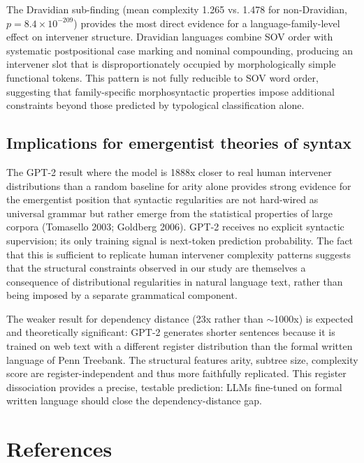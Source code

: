\documentclass[11pt,a4paper]{article}
\begin{document}
The Dravidian sub-finding (mean complexity 1.265 vs. 1.478 for non-Dravidian, $p = 8.4 \times 10^{-209}$) provides the most direct evidence for a language-family-level effect on intervener structure. Dravidian languages combine SOV order with systematic postpositional case marking and nominal compounding, producing an intervener slot that is disproportionately occupied by morphologically simple functional tokens. This pattern is not fully reducible to SOV word order, suggesting that family-specific morphosyntactic properties impose additional constraints beyond those predicted by typological classification alone.

\subsection{Implications for emergentist theories of syntax}

The GPT-2 result where the model is 1888x closer to real human intervener distributions than a random baseline for arity alone provides strong evidence for the emergentist position that syntactic regularities are not hard-wired as universal grammar but rather emerge from the statistical properties of large corpora (Tomasello 2003; Goldberg 2006). GPT-2 receives no explicit syntactic supervision; its only training signal is next-token prediction probability. The fact that this is sufficient to replicate human intervener complexity patterns suggests that the structural constraints observed in our study are themselves a consequence of distributional regularities in natural language text, rather than being imposed by a separate grammatical component.

The weaker result for dependency distance (23x rather than ${\sim}$1000x) is expected and theoretically significant: GPT-2 generates shorter sentences because it is trained on web text with a different register distribution than the formal written language of Penn Treebank. The structural features arity, subtree size, complexity score are register-independent and thus more faithfully replicated. This register dissociation provides a precise, testable prediction: LLMs fine-tuned on formal written language should close the dependency-distance gap.

\section*{References}
\end{document}
